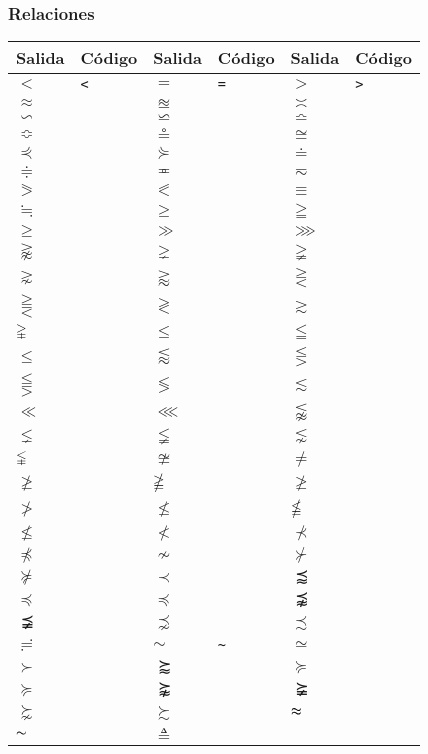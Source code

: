 \documentclass{article}
\numberwithin{equation}{section}
\theoremstyle{plain}
\theoremstyle{definition}
\theoremstyle{remark}
\def\X#1{$#1$ & \texttt{#1}} %
\begin{document}
\subsubsection{Relaciones}

\begin{table}[H]
\centering
\begin{tabular}{@{}*6l@{}}
\toprule
Salida & Código & Salida & Código & Salida & Código \\
\midrule
\X{<} & 
\X{=} & 
\X{>} \\
\X{\approx} & 
\X{\approxeq} & 
\X{\asymp} \\
\X{\backsim} & 
\X{\backsimeq} & 
\X{\bumpeq} \\
\X{\Bumpeq} & 
\X{\circeq} & 
\X{\cong} \\
\X{\curlyeqprec} & 
\X{\curlyeqsucc} & 
\X{\doteq} \\
\X{\doteqdot} & 
\X{\eqcirc} & 
\X{\eqsim} \\ 
\X{\eqslantgtr} & 
\X{\eqslantless} & 
\X{\equiv} \\
\X{\fallingdotseq} & 
\X{\geq} & 
\X{\geqq} \\
\X{\geqslant} & 
\X{\gg} & 
\X{\ggg} \\
\X{\gnapprox} & 
\X{\gneq} & 
\X{\gneqq} \\ 
\X{\gnsim} & 
\X{\gtrapprox} & 
\X{\gtreqless} \\
\X{\gtreqqless} & 
\X{\gtrless} & 
\X{\gtrsim} \\
\X{\gvertneqq} & 
\X{\leq} & 
\X{\leqq} \\
\X{\leqslant} & 
\X{\lessapprox} & 
\X{\lesseqgtr} \\ 
\X{\lesseqqgtr} & 
\X{\lessgtr} & 
\X{\lesssim} \\ 
\X{\ll} & 
\X{\lll} & 
\X{\lnapprox} \\ 
\X{\lneq} & 
\X{\lneqq} & 
\X{\lnsim} \\ 
\X{\lvertneqq} & 
\X{\ncong} & 
\X{\neq} \\ 
\X{\ngeq} & 
\X{\ngeqq} & 
\X{\ngeqslant} \\ 
\X{\ngtr} & 
\X{\nleq} & 
\X{\nleqq} \\ 
\X{\nleqslant} & 
\X{\nless} & 
\X{\nprec} \\ 
\X{\npreceq} & 
\X{\nsim} & 
\X{\nsucc} \\ 
\X{\nsucceq} & 
\X{\prec} & 
\X{\precapprox} \\ 
\X{\preccurlyeq} & 
\X{\preceq} & 
\X{\precnapprox} \\ 
\X{\precneqq} & 
\X{\precnsim} & 
\X{\precsim} \\
\X{\risingdotseq} & 
\X{\sim} & 
\X{\simeq} \\ 
\X{\succ} & 
\X{\succapprox} & 
\X{\succcurlyeq} \\
\X{\succeq} & 
\X{\succnapprox} & 
\X{\succneqq} \\ 
\X{\succnsim} & 
\X{\succsim} & 
\X{\thickapprox} \\
\X{\thicksim} & 
\X{\triangleq} &  \\
\bottomrule
\end{tabular}
\end{table}
\end{document}
